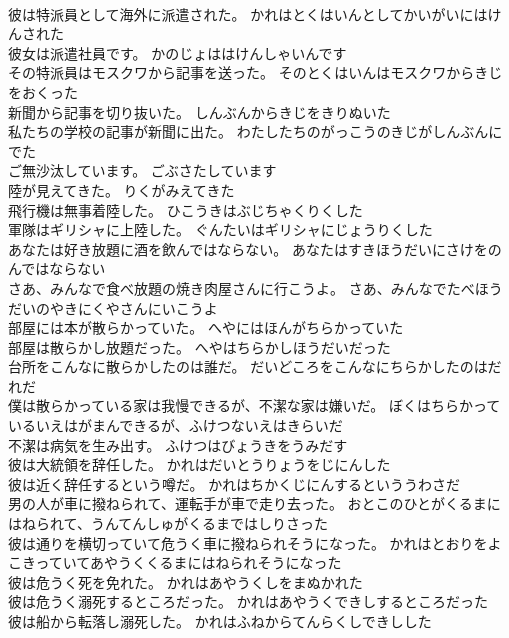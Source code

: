 \documentclass[8pt]{extreport}
\begin{document}
\begin{CJK}{UTF8}{min}
\\	彼は特派員として海外に派遣された。	かれはとくはいんとしてかいがいにはけんされた 
\\	彼女は派遣社員です。	かのじょははけんしゃいんです 
\\	その特派員はモスクワから記事を送った。	そのとくはいんはモスクワからきじをおくった 
\\	新聞から記事を切り抜いた。	しんぶんからきじをきりぬいた 
\\	私たちの学校の記事が新聞に出た。	わたしたちのがっこうのきじがしんぶんにでた 
\\	ご無沙汰しています。	ごぶさたしています 
\\	陸が見えてきた。	りくがみえてきた 
\\	飛行機は無事着陸した。	ひこうきはぶじちゃくりくした 
\\	軍隊はギリシャに上陸した。	ぐんたいはギリシャにじょうりくした 
\\	あなたは好き放題に酒を飲んではならない。	あなたはすきほうだいにさけをのんではならない 
\\	さあ、みんなで食べ放題の焼き肉屋さんに行こうよ。	さあ、みんなでたべほうだいのやきにくやさんにいこうよ 
\\	部屋には本が散らかっていた。	へやにはほんがちらかっていた 
\\	部屋は散らかし放題だった。	へやはちらかしほうだいだった 
\\	台所をこんなに散らかしたのは誰だ。	だいどころをこんなにちらかしたのはだれだ 
\\	僕は散らかっている家は我慢できるが、不潔な家は嫌いだ。	ぼくはちらかっているいえはがまんできるが、ふけつないえはきらいだ 
\\	不潔は病気を生み出す。	ふけつはびょうきをうみだす 
\\	彼は大統領を辞任した。	かれはだいとうりょうをじにんした 
\\	彼は近く辞任するという噂だ。	かれはちかくじにんするといううわさだ 
\\	男の人が車に撥ねられて、運転手が車で走り去った。	おとこのひとがくるまにはねられて、うんてんしゅがくるまではしりさった 
\\	彼は通りを横切っていて危うく車に撥ねられそうになった。	かれはとおりをよこきっていてあやうくくるまにはねられそうになった 
\\	彼は危うく死を免れた。	かれはあやうくしをまぬかれた 
\\	彼は危うく溺死するところだった。	かれはあやうくできしするところだった 
\\	彼は船から転落し溺死した。	かれはふねからてんらくしできしした 

\end{CJK}
\end{document}
